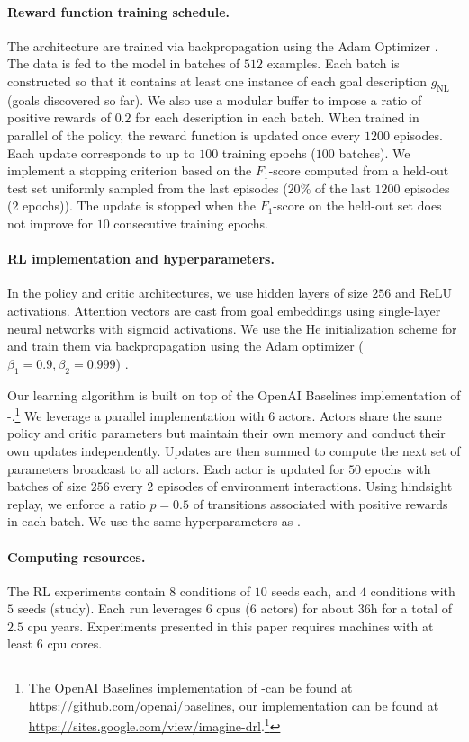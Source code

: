 \paragraph{Reward function training schedule.} The architecture are trained via backpropagation using the Adam Optimizer \cite{kingma2014adam}. The data is fed to the model in batches of $512$ examples. Each batch is constructed so that it contains at least one instance of each goal description $g_\text{NL}$ (goals discovered so far). We also use a modular buffer to impose a ratio of positive rewards of $0.2$ for each description in each batch. When trained in parallel of the policy, the reward function is updated once every $1200$ episodes. Each update corresponds to up to $100$ training epochs ($100$ batches). We implement a stopping criterion based on the $F_1$-score computed from a held-out test set uniformly sampled from the last episodes ($20\%$ of the last $1200$ episodes (2 epochs)). The update is stopped when the $F_1$-score on the held-out set does not improve for $10$ consecutive training epochs.

\paragraph{RL implementation and hyperparameters.} In the policy and critic architectures, we use hidden layers of size $256$ and ReLU activations. Attention vectors are cast from goal embeddings using single-layer neural networks with sigmoid activations. We use the He initialization scheme for \cite{he} and train them via backpropagation using the Adam optimizer ($\beta_1=0.9, \beta_2=0.999$) \cite{kingma2014adam}.

Our learning algorithm is built on top of the OpenAI Baselines implementation of \her-\ddpg.\footnote{ The OpenAI Baselines implementation of \her-\ddpg can be found at https://github.com/openai/baselines, our implementation can be found at \url{https://sites.google.com/view/imagine-drl}.\footnote{Link to our Github repository will be added in the final version.}} We leverage a parallel implementation with $6$ actors. Actors share the same policy and critic parameters but maintain their own memory and conduct their own updates independently. Updates are then summed to compute the next set of parameters broadcast to all actors. Each actor is updated for $50$ epochs with batches of size $256$ every $2$ episodes of environment interactions. Using hindsight replay, we enforce a ratio $p=0.5$ of transitions associated with positive rewards in each batch. We use the same hyperparameters as \citet{plappert2018multi}. 



\paragraph{Computing resources.}
The RL experiments contain $8$ conditions of $10$ seeds each, and $4$ conditions with $5$ seeds (\SP study). Each run leverages $6$ cpus ($6$ actors) for about $36$h for a total of $2.5$ cpu years. Experiments presented in this paper requires machines with at least $6$ cpu cores.



